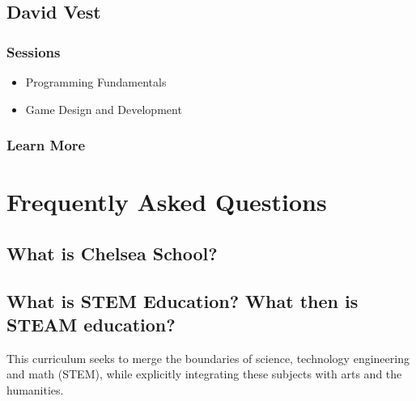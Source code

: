 \documentclass[letterpaper,10pt,english]{sphinxmanual}
\begin{document}
\section{David Vest}
\label{faculty:david-vest}

\subsection{Sessions}
\label{faculty:id1}\begin{itemize}
\item {} 
Programming Fundamentals

\item {} 
Game Design and Development

\end{itemize}


\subsection{Learn More}
\label{faculty:learn-more}

\chapter{Frequently Asked Questions}
\label{faq::doc}\label{faq:index-0}\label{faq:frequently-asked-questions}

\section{What is Chelsea School?}
\label{faq:what-is-chelsea-school}

\section{What is STEM Education? What then is STEAM education?}
\label{faq:what-is-stem-education-what-then-is-steam-education}
This curriculum seeks to merge the boundaries of science, technology engineering and math (STEM), while explicitly integrating these subjects with arts and the humanities.
\end{document}
